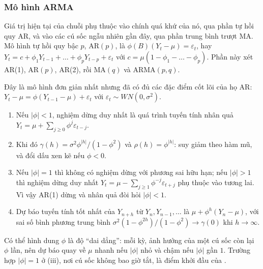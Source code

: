 \subsubsection{Mô hình ARMA}

Giá trị hiện tại của chuỗi phụ thuộc vào chính quá khứ của nó, qua phần tự hồi quy AR, và vào các cú sốc ngẫu nhiên gần đây, qua phần trung bình trượt MA. Mô hình tự hồi quy bậc $p$, AR$(p)$, là $\phi(B)(Y_t-\mu)=\varepsilon_t$, hay $Y_t=c+\phi_1Y_{t-1}+\dots+\phi_pY_{t-p}+\varepsilon_t$ với $c=\mu(1-\phi_1-\dots-\phi_p)$. Phần này xét AR(1), AR$(p)$, AR(2), rồi MA$(q)$ và ARMA$(p,q)$.

Đây là mô hình đơn giản nhất nhưng đã có đủ các đặc điểm cốt lõi của họ AR: $Y_t-\mu=\phi(Y_{t-1}-\mu)+\varepsilon_t$ với $\varepsilon_t\sim WN(0,\sigma^2)$.
\begin{kq}
\begin{enumerate}[label=(\roman*),leftmargin=*,itemsep=1pt]
\item Nếu $|\phi|<1$, nghiệm dừng duy nhất là quá trình tuyến tính nhân quả $Y_t=\mu+\sum_{j\ge0}\phi^j\varepsilon_{t-j}$.
\item Khi đó $\gamma(h)=\sigma^2\phi^{|h|}/(1-\phi^2)$ và $\rho(h)=\phi^{|h|}$: suy giảm theo hàm mũ, và đổi dấu xen kẽ nếu $\phi<0$.
\item Nếu $|\phi|=1$ thì không có nghiệm dừng với phương sai hữu hạn; nếu $|\phi|>1$ thì nghiệm dừng duy nhất $Y_t=\mu-\sum_{j\ge1}\phi^{-j}\varepsilon_{t+j}$ phụ thuộc vào tương lai. Vì vậy AR(1) dừng và nhân quả đòi hỏi $|\phi|<1$.
\item Dự báo tuyến tính tốt nhất của $Y_{n+h}$ từ $Y_n,Y_{n-1},\dots$ là $\mu+\phi^h(Y_n-\mu)$, với sai số bình phương trung bình $\sigma^2(1-\phi^{2h})/(1-\phi^2)\to\gamma(0)$ khi $h\to\infty$.
\end{enumerate}
\end{kq}
Có thể hình dung $\phi$ là độ ``dai dẳng'': mỗi kỳ, ảnh hưởng của một cú sốc còn lại $\phi$ lần, nên dự báo quay về $\mu$ nhanh nếu $|\phi|$ nhỏ và chậm nếu $|\phi|$ gần $1$. Trường hợp $|\phi|=1$ ở (iii), nơi cú sốc không bao giờ tắt, là điểm khởi đầu của .

